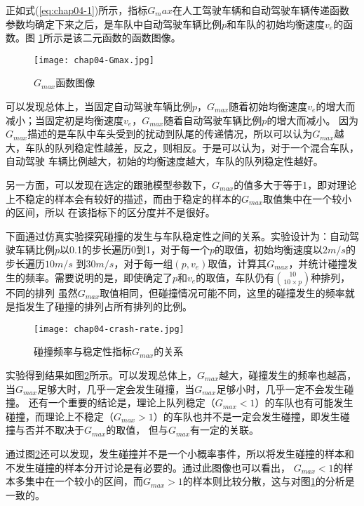 正如式(\ref{eq:chap04-1})所示，指标$G_max$在人工驾驶车辆和自动驾驶车辆传递函数参数均确定下来之后，是车队中自动驾驶车辆比例$p$和车队的初始均衡速度$v_e$的函数。图
\ref{fig:chap04-1}所示是该二元函数的函数图像。

\begin{figure}
    \centering
    \texttt{[image: chap04-Gmax.jpg]}
    \caption{$G_{max}$函数图像}
    \label{fig:chap04-1}
\end{figure}

可以发现总体上，当固定自动驾驶车辆比例$p$，$G_{max}$随着初始均衡速度$v_e$的增大而减小；当固定初是均衡速度$v_e$，$G_{max}$随着自动驾驶车辆比例$p$的增大而减小。
因为$G_{max}$描述的是车队中车头受到的扰动到队尾的传递情况，所以可以认为$G_{max}$越大，车队的队列稳定性越差，反之，则相反。于是可以认为，对于一个混合车队，自动驾驶
车辆比例越大，初始的均衡速度越大，车队的队列稳定性越好。

另一方面，可以发现在选定的跟驰模型参数下，$G_{max}$的值多大于等于1，即对理论上不稳定的样本会有较好的描述，而由于稳定的样本的$G_{max}$取值集中在一个较小的区间，所以
在该指标下的区分度并不是很好。

下面通过仿真实验探究碰撞的发生与车队稳定性之间的关系。实验设计为：自动驾驶车辆比例$p$以0.1的步长遍历0到1，对于每一个$p$的取值，初始均衡速度以$2m/s$的步长遍历$10m/s$
到$30m/s$，对于每一组$(p, v_e)$取值，计算其$G_{max}$，并统计碰撞发生的频率。需要说明的是，即使确定了$p$和$v_e$的取值，车队仍有$\binom{10}{10\times p}$种排列，不同的排列
虽然$G_{max}$取值相同，但碰撞情况可能不同，这里的碰撞发生的频率就是指发生了碰撞的排列占所有排列的比例。

\begin{figure}
    \centering
    \texttt{[image: chap04-crash-rate.jpg]}
    \caption{碰撞频率与稳定性指标$G_{max}$的关系}
    \label{fig:chap04-2}
\end{figure}

实验得到结果如图\ref{fig:chap04-2}所示。可以发现总体上，$G_{max}$越大，碰撞发生的频率也越高，当$G_{max}$足够大时，几乎一定会发生碰撞，当$G_{max}$足够小时，几乎一定不会发生碰撞。
还有一个重要的结论是，理论上队列稳定（$G_{max} < 1$）的车队也有可能发生碰撞，而理论上不稳定（$G_{max} > 1$）的车队也并不是一定会发生碰撞，即发生碰撞与否并不取决于$G_{max}$的取值，
但与$G_{max}$有一定的关联。

通过图\ref{fig:chap04-2}还可以发现，发生碰撞并不是一个小概率事件，所以将发生碰撞的样本和不发生碰撞的样本分开讨论是有必要的。通过此图像也可以看出，
$G_{max} < 1$的样本多集中在一个较小的区间，而$G_{max} > 1$的样本则比较分散，这与对图\ref{fig:chap04-1}的分析是一致的。

